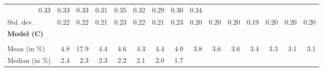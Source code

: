 \begin{tabular}{lllllllllllllll}
  \multicolumn{1}{r}{0.33} &
  \multicolumn{1}{r}{0.33} &
  \multicolumn{1}{r}{0.33} &
  \multicolumn{1}{r}{0.31} &
  \multicolumn{1}{r}{0.35} &
  \multicolumn{1}{r}{0.32} &
  \multicolumn{1}{r}{0.29} &
  \multicolumn{1}{r}{0.30} &
  \multicolumn{1}{r}{0.34} \\
\multicolumn{1}{l}{\hspace{2em}Std. dev.} &
  \multicolumn{1}{|r}{0.22} &
  \multicolumn{1}{r}{0.22} &
  \multicolumn{1}{r}{0.21} &
  \multicolumn{1}{r}{0.23} &
  \multicolumn{1}{r}{0.22} &
  \multicolumn{1}{r}{0.21} &
  \multicolumn{1}{r}{0.23} &
  \multicolumn{1}{r}{0.20} &
  \multicolumn{1}{r}{0.20} &
  \multicolumn{1}{r}{0.20} &
  \multicolumn{1}{r}{0.19} &
  \multicolumn{1}{r}{0.20} &
  \multicolumn{1}{r}{0.20} &
  \multicolumn{1}{r}{0.20} \\
\multicolumn{1}{l}{{\textbf{Model (C)}}} &
  \multicolumn{1}{|r}{} &
  \multicolumn{1}{r}{} &
  \multicolumn{1}{r}{} &
  \multicolumn{1}{r}{} &
  \multicolumn{1}{r}{} &
  \multicolumn{1}{r}{} &
  \multicolumn{1}{r}{} &
  \multicolumn{1}{r}{} &
  \multicolumn{1}{r}{} &
  \multicolumn{1}{r}{} &
  \multicolumn{1}{r}{} &
  \multicolumn{1}{r}{} &
  \multicolumn{1}{r}{} &
  \multicolumn{1}{r}{} \\
\multicolumn{1}{l}{\hspace{1em}{\textit{Additive term} ($\widehat{t}^{add}/\widetilde{p}$)}} &
  \multicolumn{1}{|r}{} &
  \multicolumn{1}{r}{} &
  \multicolumn{1}{r}{} &
  \multicolumn{1}{r}{} &
  \multicolumn{1}{r}{} &
  \multicolumn{1}{r}{} &
  \multicolumn{1}{r}{} &
  \multicolumn{1}{r}{} &
  \multicolumn{1}{r}{} &
  \multicolumn{1}{r}{} &
  \multicolumn{1}{r}{} &
  \multicolumn{1}{r}{} &
  \multicolumn{1}{r}{} &
  \multicolumn{1}{r}{} \\
\multicolumn{1}{l}{\hspace{2em}Mean (in $\%$)} &
  \multicolumn{1}{|r}{4.8} &
  \multicolumn{1}{r}{17.9} &
  \multicolumn{1}{r}{4.4} &
  \multicolumn{1}{r}{4.6} &
  \multicolumn{1}{r}{4.3} &
  \multicolumn{1}{r}{4.4} &
  \multicolumn{1}{r}{4.0} &
  \multicolumn{1}{r}{3.8} &
  \multicolumn{1}{r}{3.6} &
  \multicolumn{1}{r}{3.6} &
  \multicolumn{1}{r}{3.4} &
  \multicolumn{1}{r}{3.3} &
  \multicolumn{1}{r}{3.1} &
  \multicolumn{1}{r}{3.1} \\
\multicolumn{1}{l}{\hspace{2em}Median (in $\%$)} &
  \multicolumn{1}{|r}{2.4} &
  \multicolumn{1}{r}{2.3} &
  \multicolumn{1}{r}{2.3} &
  \multicolumn{1}{r}{2.2} &
  \multicolumn{1}{r}{2.1} &
  \multicolumn{1}{r}{2.0} &
  \multicolumn{1}{r}{1.7} &

\end{tabular}
